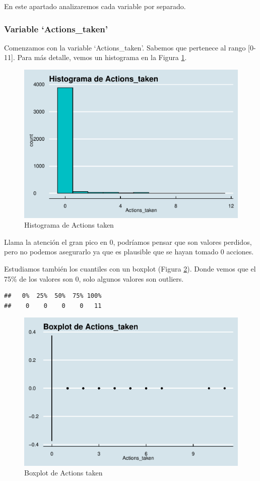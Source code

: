 \documentclass[
]{article}
\begin{document}
En este apartado analizaremos cada variable por separado.

\hypertarget{variable-actions_taken}{%
\subsubsection{Variable `Actions\_taken'}\label{variable-actions_taken}}

Comenzamos con la variable `Actions\_taken'. Sabemos que pertenece al
rango {[}0-11{]}. Para más detalle, vemos un histograma en la Figura
\ref{fig:hist_at}.

\begin{figure}

{\centering \includegraphics[width=0.5\linewidth]{anacalt-regresion_files/figure-latex/hist_at-1} 

}

\caption{Histograma de Actions taken}\label{fig:hist_at}
\end{figure}

Llama la atención el gran pico en 0, podríamos pensar que son valores
perdidos, pero no podemos asegurarlo ya que es plausible que se hayan
tomado 0 acciones.

Estudiamos también los cuantiles con un boxplot (Figura
\ref{fig:box_at}). Donde vemos que el 75\% de los valores son 0, solo
algunos valores son outliers.

\begin{verbatim}
##   0%  25%  50%  75% 100% 
##    0    0    0    0   11
\end{verbatim}

\begin{figure}

{\centering \includegraphics[width=0.5\linewidth]{anacalt-regresion_files/figure-latex/box_at-1} 

}

\caption{Boxplot de Actions taken}\label{fig:box_at}
\end{figure}
\end{document}
